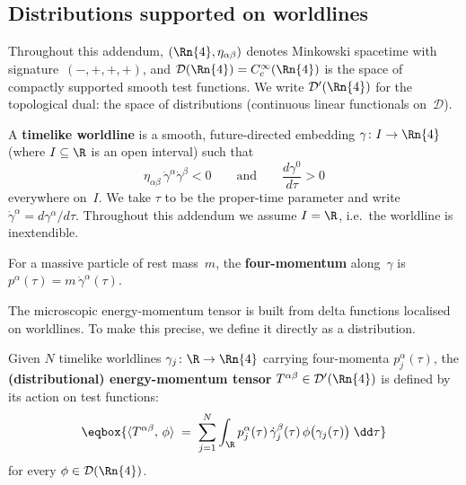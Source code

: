 
\subsection{Distributions supported on worldlines}%
\label{sec:dist-worldlines}

Throughout this addendum, $(\Rn{4}, \eta_{\alpha\beta})$ denotes
Minkowski spacetime with signature~$(-,+,+,+)$, and
$\mathcal{D}(\Rn{4}) = C_c^\infty(\Rn{4})$ is the space of
compactly supported smooth test functions.  We write
$\mathcal{D}'(\Rn{4})$ for the topological dual: the space of
distributions (continuous linear functionals on~$\mathcal{D}$).

\begin{definition}\label{def:timelike-worldline}
  A \textbf{timelike worldline} is a smooth, future-directed
  embedding $\gamma\colon I \to \Rn{4}$ (where $I\subseteq\R$ is
  an open interval) such that
  \begin{equation}\label{eq:timelike-condition}
    \eta_{\alpha\beta}\,\dot\gamma^\alpha\dot\gamma^\beta < 0
    \qquad\text{and}\qquad
    \frac{d\gamma^0}{d\tau} > 0
  \end{equation}
  everywhere on~$I$.  We take $\tau$ to be the proper-time
  parameter and write
  $\dot\gamma^\alpha = d\gamma^\alpha/d\tau$.  Throughout this
  addendum we assume $I = \R$, i.e.\ the worldline is
  inextendible.
\end{definition}

\noindent
For a massive particle of rest mass~$m$, the
\textbf{four-momentum} along~$\gamma$ is
$p^\alpha(\tau) = m\,\dot\gamma^\alpha(\tau)$.

The microscopic energy-momentum tensor is built from delta
functions localised on worldlines.  To make this precise, we define
it directly as a distribution.

\begin{definition}%
\label{def:Tmunu-dist}
  Given $N$ timelike worldlines $\gamma_j\colon \R \to \Rn{4}$
  carrying four-momenta $p_j^\alpha(\tau)$, the
  \textbf{(distributional) energy-momentum tensor}
  $T^{\alpha\beta} \in \mathcal{D}'(\Rn{4})$ is defined by its
  action on test functions:
  \begin{equation}\label{eq:Tmunu-dist-def}
    \eqbox{\langle T^{\alpha\beta},\, \phi\rangle
      \;=\; \sum_{j=1}^{N} \int_{\R} p_j^\alpha(\tau)\,
        \dot\gamma_j^\beta(\tau)\,
        \phi\bigl(\gamma_j(\tau)\bigr)\;\dd\tau}
  \end{equation}
  for every $\phi \in \mathcal{D}(\Rn{4})$.
\end{definition}

